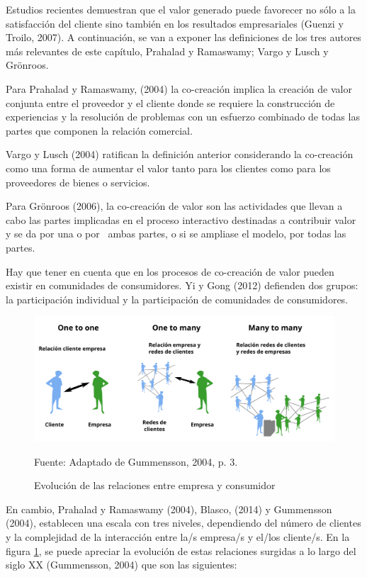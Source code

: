 Estudios recientes demuestran que el valor generado puede favorecer no sólo a la satisfacción del cliente sino también en los resultados empresariales (Guenzi y Troilo, 2007). A continuación, se van a exponer las definiciones de los tres autores más relevantes de este capítulo, Prahalad y Ramaswamy; Vargo y Lusch y Grönroos.

Para Prahalad y Ramaswamy, (2004) la co-creación implica la creación de valor conjunta entre el proveedor y el cliente donde se requiere la construcción de experiencias y la resolución de problemas con un esfuerzo combinado de todas las partes que componen la relación comercial. 

Vargo y Lusch (2004) ratifican la definición anterior considerando la co-creación como una forma de aumentar el valor tanto para los clientes como para los proveedores de bienes o servicios. 

Para Grönroos (2006), la co-creación de valor son las actividades que llevan a cabo las partes implicadas en el proceso interactivo destinadas a contribuir valor y se da por una o por  ambas partes, o si se ampliase el modelo, por todas las partes.

Hay que tener en cuenta que en los procesos de co-creación de valor pueden existir en comunidades de consumidores. Yi y Gong (2012) defienden dos grupos: la participación individual y la participación de comunidades de consumidores. 

\begin{figure}[!h]
	\caption{Evolución de las relaciones entre empresa y consumidor}
	\centering \includegraphics[width=150mm]{capitulos/graficos/oneMany} 
	\label{fig:oneMany} 
	
		\footnotesize
		Fuente: Adaptado de Gummensson, 2004, p. 3.
\end{figure}

En cambio, Prahalad y Ramaswamy (2004), Blasco, (2014) y Gummensson (2004), establecen una escala con tres niveles, dependiendo del número de clientes y la complejidad de la interacción entre la/s empresa/s y el/los cliente/s. En la figura  \ref{fig:oneMany}, se puede apreciar la evolución de estas relaciones surgidas a lo largo del siglo XX (Gummensson, 2004) que son las siguientes:

